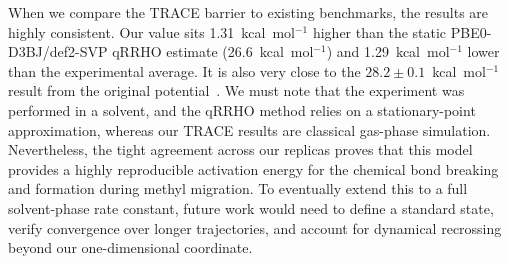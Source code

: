 \documentclass[aps,prx,preprint,notitlepage,superscriptaddress,nofootinbib,floatfix]{revtex4-2}
\begin{document}
When we compare the TRACE barrier to existing benchmarks, the results are highly consistent. Our value sits 1.31~kcal~mol$^{-1}$ higher than the static PBE0-D3BJ/def2-SVP qRRHO estimate (26.6~kcal~mol$^{-1}$) and 1.29~kcal~mol$^{-1}$ lower than the experimental average. It is also very close to the $28.2 \pm 0.1$~kcal~mol$^{-1}$ result from the original potential~\cite{vitartas2026}. We must note that the experiment was performed in a solvent, and the qRRHO method relies on a stationary-point approximation, whereas our TRACE results are classical gas-phase simulation. Nevertheless, the tight agreement across our replicas proves that this model provides a highly reproducible activation energy for the chemical bond breaking and formation during methyl migration. To eventually extend this to a full solvent-phase rate constant, future work would need to define a standard state, verify convergence over longer trajectories, and account for dynamical recrossing beyond our one-dimensional coordinate.


\FloatBarrier
\end{document}

